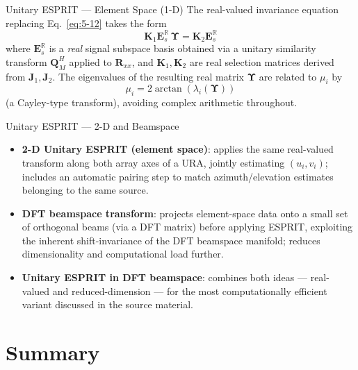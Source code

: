 \documentclass[10pt,aspectratio=169]{beamer}
\newcommand{\bR}{\bm{R}}
\newcommand{\bJ}{\bm{J}}
\begin{document}
\begin{frame}{Unitary ESPRIT --- Element Space (1-D)}
The real-valued invariance equation replacing Eq.~\ref{eq:5-12} takes the form
\[
	\bm{K}_1 \bm{E}_{s}^{\mathbb{R}} \,\bm\Upsilon = \bm{K}_2 \bm{E}_{s}^{\mathbb{R}}
\]
where $\bm{E}_s^{\mathbb{R}}$ is a \emph{real} signal subspace basis obtained via a unitary similarity transform $\bm{Q}_M^H$ applied to $\bR_{xx}$, and $\bm{K}_1,\bm{K}_2$ are real selection matrices derived from $\bJ_1,\bJ_2$. The eigenvalues of the resulting real matrix $\bm\Upsilon$ are related to $\mu_i$ by
\[
	\mu_i = 2\arctan(\lambda_i(\bm\Upsilon))
\]
(a Cayley-type transform), avoiding complex arithmetic throughout.
\end{frame}

\begin{frame}{Unitary ESPRIT --- 2-D and Beamspace}
\begin{itemize}
	\item \textbf{2-D Unitary ESPRIT (element space)}: applies the same real-valued transform along both array axes of a URA, jointly estimating $(u_i,v_i)$; includes an automatic pairing step to match azimuth/elevation estimates belonging to the same source.
	\item \textbf{DFT beamspace transform}: projects element-space data onto a small set of orthogonal beams (via a DFT matrix) before applying ESPRIT, exploiting the inherent shift-invariance of the DFT beamspace manifold; reduces dimensionality and computational load further.
	\item \textbf{Unitary ESPRIT in DFT beamspace}: combines both ideas --- real-valued and reduced-dimension --- for the most computationally efficient variant discussed in the source material.
\end{itemize}
\end{frame}

\section{Summary}
\end{document}
